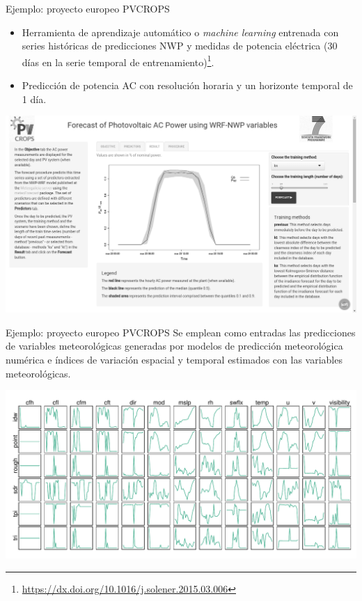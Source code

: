 \documentclass[aspectratio=169, usenames,svgnames,dvipsnames]{beamer}
\begin{document}
\begin{frame}[label={sec:org973571f}]{Ejemplo: proyecto europeo PVCROPS}
\begin{itemize}
\item Herramienta de \alert{aprendizaje automático} o \emph{machine learning}
entrenada con \alert{series históricas} de \alert{predicciones NWP} y \alert{medidas de
potencia eléctrica} (30 días en la serie temporal de
entrenamiento)\footnote{\url{https://dx.doi.org/10.1016/j.solener.2015.03.006}}.
\item \alert{Predicción de potencia AC} con resolución \alert{horaria} y un horizonte
temporal de \alert{1 día}.
\end{itemize}


\begin{center}
\includegraphics[height=0.6\textheight]{../figs/ForecastShiny.png}
\end{center}
\end{frame}

\begin{frame}[label={sec:org195422a}]{Ejemplo: proyecto europeo PVCROPS}
Se emplean como entradas las predicciones de \alert{variables
meteorológicas} generadas por modelos de predicción meteorológica
numérica e \alert{índices de variación espacial y temporal} estimados con
las variables meteorológicas.

\begin{center}
\includegraphics[height=0.7\textheight]{../figs/varsComplete.pdf}
\end{center}
\end{frame}
\end{document}
